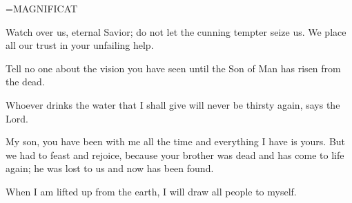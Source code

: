 \hangindent=\parindent \small MAGNIFICAT
\begin{description}[labelindent=\parindent, leftmargin=*]
\item [Week 1:] 	Watch over us, eternal Savior; do not let the cunning tempter seize us. We place all our trust in your unfailing help.
\item [Week 2:] 	Tell no one about the vision you have seen until the Son of Man has risen from the dead.
\item [Week 3:] 	Whoever drinks the water that I shall give will never be thirsty again, says the Lord.
\item [Week 4:] 	My son, you have been with me all the time and everything I have is yours. But we had to feast and rejoice, because your brother was dead and has come to life again; he was lost to us and now has been found.
\item [Week 5:] 	When I am lifted up from the earth, I will draw all people to myself.
\end{description}
